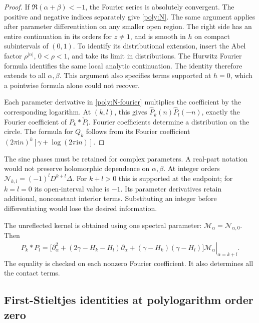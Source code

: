 \documentclass[11pt,letterpaper]{article}
\numberwithin{equation}{section}
\theoremstyle{plain}
\theoremstyle{definition}
\theoremstyle{remark}
\newcommand{\numi}{\mathrm i}
\begin{document}
\begin{proof}
If \(\Re(\alpha+\beta)<-1\), the Fourier series is absolutely convergent.
The positive and negative indices separately give
\eqref{poly:N}. The same argument applies after parameter
differentiation on any smaller open region. The right side has an
entire continuation in its orders for \(z\ne1\), and is smooth in \(h\)
on compact subintervals of \((0,1)\). To identify its distributional
extension, insert the Abel factor \(\rho^{|n|}\), \(0<\rho<1\),
and take its limit in distributions. The Hurwitz Fourier formula
identifies the same local analytic continuation. The identity
therefore extends to all \(\alpha,\beta\). This argument also
specifies terms supported at \(h=0\), which a pointwise formula alone
could not recover.

Each parameter derivative in \eqref{poly:N-fourier} multiplies the
coefficient by the corresponding logarithm. At \((k,l)\), this gives
\(\widehat P_k(n)\widehat P_l(-n)\), exactly the Fourier coefficient of
\(P_k*\check P_l\). Fourier coefficients determine a distribution on
the circle. The formula for \(Q_k\) follows from its Fourier coefficient
\((2\pi\numi n)^k[\gamma+\log(2\pi\numi n)]\).
\end{proof}

The sine phases must be retained for complex parameters. A real-part
notation would not preserve holomorphic dependence on
\(\alpha,\beta\). At integer orders
\(\mathcal N_{k,l}=(-1)^lD^{k+l}\Delta\).
For \(k+l>0\) this is supported at the endpoint; for \(k=l=0\) its
open-interval value is \(-1\). Its parameter derivatives retain
additional, nonconstant interior terms. Substituting an integer
before differentiating would lose the desired information.

The unreflected kernel is obtained using one spectral parameter:
\(\mathcal M_\alpha=\mathcal N_{\alpha,0}\). Then
\begin{align}\label{poly:unreflected}
 P_k*P_l=\left.
 \bigl[\partial_\alpha^2
  +(2\gamma-H_k-H_l)\partial_\alpha
  +(\gamma-H_k)(\gamma-H_l)\bigr]\mathcal M_\alpha
 \right|_{\alpha=k+l}.
\end{align}
The equality is checked on each nonzero Fourier coefficient.
It also determines all the contact terms.

\subsection{First-Stieltjes identities at polylogarithm order zero}
\end{document}
